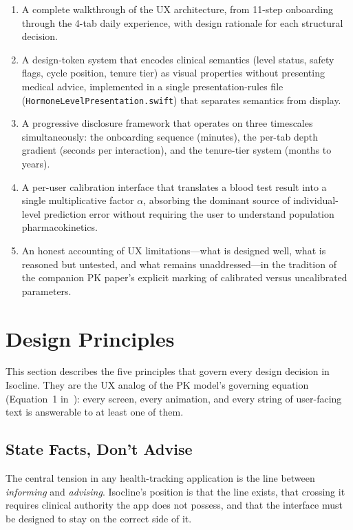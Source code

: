 \documentclass[11pt,a4paper]{article}
\newcommand{\code}[1]{\texttt{\small #1}}
\begin{document}
\begin{enumerate}[nosep,leftmargin=1.4em]
\item A complete walkthrough of the UX architecture, from 11-step
  onboarding through the 4-tab daily experience, with design rationale
  for each structural decision.
\item A design-token system that encodes clinical semantics (level status,
  safety flags, cycle position, tenure tier) as visual properties without
  presenting medical advice, implemented in a single presentation-rules
  file (\code{HormoneLevelPresentation.swift}) that separates semantics
  from display.
\item A progressive disclosure framework that operates on three
  timescales simultaneously: the onboarding sequence (minutes), the
  per-tab depth gradient (seconds per interaction), and the tenure-tier
  system (months to years).
\item A per-user calibration interface that translates a blood test result
  into a single multiplicative factor $\alpha$, absorbing the dominant
  source of individual-level prediction error without requiring the user
  to understand population pharmacokinetics.
\item An honest accounting of UX limitations---what is designed well,
  what is reasoned but untested, and what remains unaddressed---in the
  tradition of the companion PK paper's explicit marking of calibrated
  versus uncalibrated parameters.
\end{enumerate}

\section{Design Principles}
\label{sec:principles}

This section describes the five principles that govern every design
decision in Isocline. They are the UX analog of the PK model's governing
equation (Equation~1 in~\cite{xtpk}): every screen, every animation, and
every string of user-facing text is answerable to at least one of them.

\subsection{State Facts, Don't Advise}
\label{sec:state_facts}

The central tension in any health-tracking application is the line
between \emph{informing} and \emph{advising}. Isocline's position is that the
line exists, that crossing it requires clinical authority the app does
not possess, and that the interface must be designed to stay on the
correct side of it.
\end{document}
